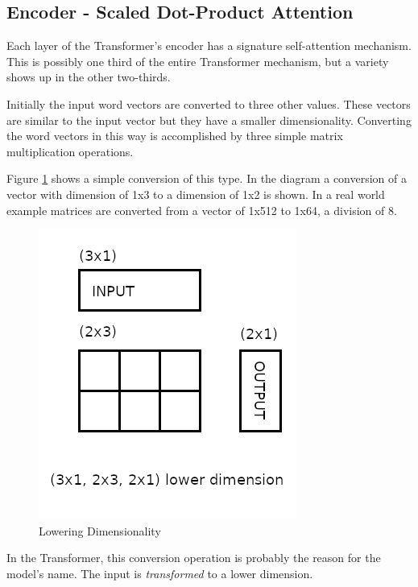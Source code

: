 \subsection{Encoder - Scaled Dot-Product Attention}

Each layer of the Transformer's encoder has a signature self-attention mechanism. This is possibly one third of the entire Transformer mechanism, but a variety shows up in the other two-thirds. 

Initially the input word vectors are converted to three other values. These vectors are similar to the input vector but they have a smaller dimensionality. Converting the word vectors in this way is accomplished by three simple matrix multiplication operations.

Figure \ref{diagram-mat-mult-01} shows a simple conversion of this type. In the diagram a conversion of a vector with dimension of 1x3 to a dimension of 1x2 is shown. In a real world example matrices are converted from a vector of 1x512 to 1x64, a division of 8.



\begin{figure}[H]
	\begin{center}
		
	
	\includegraphics[scale=0.5]{diagram-mat01}
\end{center}
	\caption[Lowering Dimensionality]{Lowering Dimensionality}
	
	\label{diagram-mat-mult-01}
\end{figure}

In the Transformer, this conversion operation is probably the reason for the model's name. The input is \textit{transformed} to a lower dimension. 

